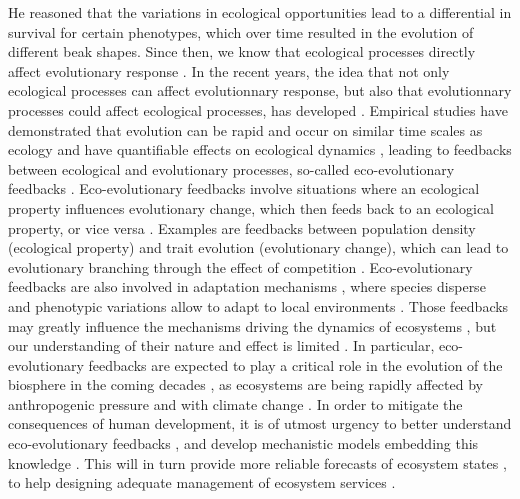 % 
He reasoned that the variations in ecological opportunities lead to a differential in survival for certain phenotypes, which over time resulted in the evolution of different beak shapes.
% 
Since then, we know that ecological processes directly affect evolutionary response \cite{Ezard2009}.
% 
In the recent years, the idea that not only ecological processes can affect evolutionnary response, but also that evolutionnary processes could affect ecological processes, has developed \cite{XXX}.
% 
Empirical studies have demonstrated that evolution can be rapid and occur on similar time scales as ecology \cite{Hairston2005, Pelletier2009} and have quantifiable effects on ecological dynamics \cite{Ezard2009}, leading to feedbacks between ecological and evolutionary processes, so-called eco-evolutionary feedbacks \cite{Pelletier2009,Schoener2011}. 
% 
Eco-evolutionary feedbacks involve situations where an ecological property influences evolutionary change, which then feeds back to an ecological property, or vice versa \cite{Govaert2019a}. Examples are feedbacks between population density (ecological property) and trait evolution (evolutionary change), which can lead to evolutionary branching through the effect of competition \cite{Doebeli1999}.
% 
Eco-evolutionary feedbacks are also involved in adaptation mechanisms \cite{Doebeli1999}, where species disperse and phenotypic variations allow to adapt to local environments \cite{XXX}.
% 
Those feedbacks may greatly influence the mechanisms driving the dynamics of ecosystems \cite{Urban2016}, but our understanding of their nature and effect is limited \cite{Lion2022}.
% 
In particular, eco-evolutionary feedbacks are expected to play a critical role in the evolution of the biosphere in the coming decades \cite{Norberg2012}, as ecosystems are being rapidly affected by anthropogenic pressure and with climate change \cite{Ellis2011,Midgley2019}.
% 
In order to mitigate the consequences of human development, it is of utmost urgency to better understand eco-evolutionary feedbacks \cite{Norberg2012}, and develop mechanistic models embedding this knowledge \cite{Urban2016}. This will in turn provide more reliable forecasts of ecosystem states \cite{Clark2001}, to help designing adequate management of ecosystem services \cite{Urban2016}.
% 
% 



